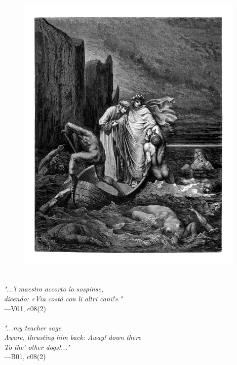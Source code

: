 \documentclass[../Dore_vision.tex]{subfiles}
\begin{document}
\begin{figure}[ht]
\centering
\includegraphics[height=\figsize]{illustrations/book_1/V01, c08(2).jpg}
\end{figure}

\begin{center}
\begin{minipage}{0.8\linewidth}
\textit{\\
"...’l maestro accorto lo sospinse,\\dicendo: «Via costà con li altri cani!»."} \\
—V01, c08(2) \\~\\
\textit{"...my teacher sage\\Aware, thrusting him back: \textquotesingle Away! down there\\To the' other dogs!\textquotesingle..."} \\
—B01, c08(2)
\end{minipage}
\end{center}

\newpage
\end{document}
